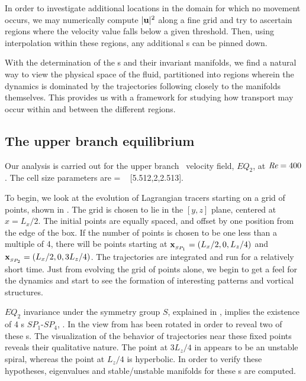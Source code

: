 \documentclass[letter,12pt,openany]{article}
\begin{document}
In order to investigate additional locations in the domain for which no 
movement occurs, we may numerically compute $|{\bf u}|^{2}$ along a fine grid 
and try to ascertain regions where the velocity value falls below a given 
threshold. Then, using interpolation within these regions, any additional  
\stagp s can be pinned down. 

With the determination of the {\stagp}s and their invariant manifolds, we 
find a natural way to view the physical space of the fluid, partitioned 
into regions wherein the dynamics is dominated by the trajectories 
following closely to the manifolds themselves. This provides us with a 
framework for studying how transport may occur within and between the 
different regions. 

\subsection{The upper branch equilibrium}
\label{s:eq2}

Our analysis is carried out for the upper branch \eqv\ velocity field, 
$EQ_2$, at $\textit{Re} = 400$. 
The cell size parameters are 
\beq   
[L_x,2,L_z]
         = \; [2\pi/1.14,2,4\pi/5]
         ~ [5.512,2,2.513].

To begin, we look at the evolution of Lagrangian tracers starting on a 
grid of points, shown in . The grid is chosen to lie 
in the $[y,z]$ plane, centered at $x = L_x/2$. The initial points are 
equally spaced, and offset by one position from the edge of the box. If 
the number of points is chosen to be one less than a multiple of 4, there 
will be points starting at $\bold{x}_{_{SP_{1}}}=(L_x/2,0,L_z/4)$ and 
$\bold{x}_{_{SP_{2}}}=(L_x/2,0,3L_z/4)$. The trajectories are integrated 
and run for a relatively short time. Just from evolving the 
grid of points alone, we begin to get a feel for the dynamics and start 
to see the formation of interesting patterns and vortical structures. 

$EQ_2$ invariance under the symmetry group $S$, explained  in 
, implies the existence of 4 \stagp s 
$SP_1$-$SP_4$, . In  the view 
from  has been rotated in order to reveal two of 
these \stagp s. The visualization of the behavior of trajectories near 
these fixed points reveals their  qualitative nature. The point at 
$3L_z/4$ in  appears to be an unstable spiral, 
whereas the point at $L_z/4$ is hyperbolic. In order to verify these 
hypotheses, eigenvalues and stable/unstable manifolds for these \stagp s 
are computed. 
\end{document}

